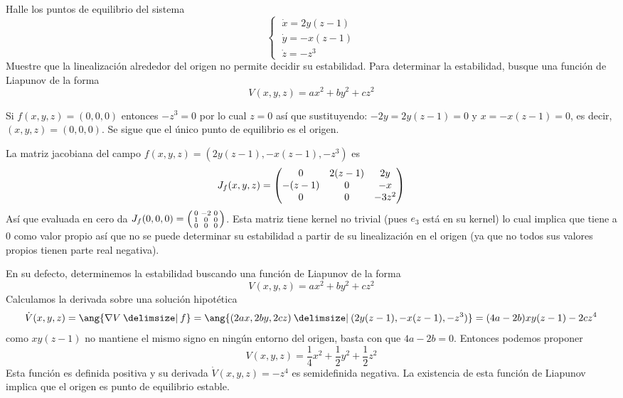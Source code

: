 \begin{ejer}
Halle los puntos de equilibrio del sistema
\[
\begin{cases}
\;\dot{x} = 2y(z-1) \\
\;\dot{y} = -x(z-1) \\
\;\dot{z} = -z^3
\end{cases}
\]
Muestre que la linealización alrededor del origen no permite decidir su estabilidad. Para determinar la estabilidad, busque una función de Liapunov de la forma \[V(x,y,z) = ax^2 + by^2 + cz^2\]
\end{ejer}
\begin{sol}
Si $f(x,y,z) = (0,0,0)$ entonces $-z^3 = 0$ por lo cual $z = 0$ así que sustituyendo: $-2y = 2y(z-1) = 0$ y $x = -x(z-1) = 0$, es decir, $(x,y,z) = (0,0,0)$. Se sigue que el único punto de equilibrio es el origen.

La matriz jacobiana del campo $f(x,y,z) = (2y(z-1), -x(z-1), -z^3)$ es
\[
J_f(x,y,z) =%
\mqty(%
0 & 2(z-1) & 2y\\
-(z-1) & 0 & -x\\
0 & 0 & -3z^2
)
\]
Así que evaluada en cero da $J_f(0,0,0) = \smqty(0&-2&0\\1&0&0\\0&0&0)$. Esta matriz tiene kernel no trivial (pues $e_3$ está en su kernel) lo cual implica que tiene a $0$ como valor propio así que no se puede determinar su estabilidad a partir de su linealización en el origen (ya que no todos sus valores propios tienen parte real negativa).

En su defecto, determinemos la estabilidad buscando una función de Liapunov de la forma 
\[
V(x,y,z) = ax^2 + by^2 + cz^2
\]
Calculamos la derivada sobre una solución hipotética 
\[
\dot{V}(x,y,z) = \ang{\nabla V \given f} = \ang{(2ax,2by,2cz) \given (2y(z-1),-x(z-1),-z^3)} = (4a-2b)xy(z-1) - 2cz^4
\]
como $xy(z-1)$ no mantiene el mismo signo en ningún entorno del origen, basta con que $4a-2b = 0$. Entonces podemos proponer
\[
V(x,y,z) = \frac14x^2 + \frac12y^2 + \frac12z^2
\]
Esta función es definida positiva y su derivada $\dot{V}(x,y,z) = -z^4$ es semidefinida negativa. La existencia de esta función de Liapunov implica que el origen es punto de equilibrio estable.
\end{sol}


